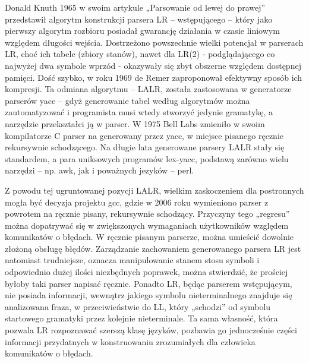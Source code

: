 Donald Knuth 1965 w swoim artykule „Parsowanie od lewej do prawej”\cite{TRANSLATION_FROM_LEFT_TO_RIGHT} przedstawił algorytm konstrukcji parsera LR – wstępującego – który jako pierwszy algorytm rozbioru posiadał gwarancję działania w czasie liniowym względem długości wejścia. Dostrzeżono powszechnie wielki potencjał w parserach LR,  choć ich tabele (zbiory stanów), nawet dla LR(2) - podglądającego co najwyżej dwa symbole wprzód - okazywały się zbyt obszerne względem dostępnej pamięci. Dość szybko, w roku 1969 de Remer zaproponował efektywny sposób ich kompresji\cite{LALR}. Ta odmiana algorytmu – LALR, została zastosowana w generatorze parserów yacc – gdyż generowanie tabel według algorytmów można zautomatyzować i programista musi wtedy stworzyć jedynie gramatykę, a narzędzie przekształci ją w parser. W 1975 Bell Labs zmieniło w swoim kompilatorze C parser na generowany przez yacc, w miejsce pisanego ręcznie rekursywnie schodzącego. Na długie lata generowane parsery LALR stały się standardem, a para uniksowych programów lex-yacc, podstawą zarówno wielu narzędzi – np. awk, jak i poważnych jezyków – perl\cite{parsing_timeline_kegler}.

Z powodu tej ugruntowanej pozycji LALR, wielkim zaskoczeniem dla postronnych mogła być decyzja projektu gcc, gdzie w 2006 roku wymieniono parser z powrotem na ręcznie pisany, rekursywnie schodzący\cite{gcc_2006_release_note}. Przyczyny tego „regresu” można dopatrywać się w zwiększonych wymaganiach użytkowników względem komunikatów o błędach. W ręcznie pisanym parserze, można umieścić dowolnie złożoną obsługę błędów. Zarządzanie zachowaniem generowanego parsera LR jest natomiast trudniejsze, oznacza manipulowanie stanem stosu symboli i odpowiednio dużej ilości niezbędnych poprawek, można stwierdzić, że prościej byłoby taki parser napisać ręcznie. Ponadto LR, będąc parserem wstępującym, nie posiada informacji, wewnątrz jakiego symbolu nieterminalnego znajduje się analizowana fraza, w przeciwieństwie do LL, który „schodzi” od symbolu startowego gramatyki przez kolejnie nieterminale. Ta sama własność, która pozwala LR rozpoznawać szerszą klasę języków, pozbawia go jednocześnie części informacji przydatnych w konstruowaniu zrozumiałych dla człowieka komunikatów o błędach\cite{parsing_timeline_kegler}.%

